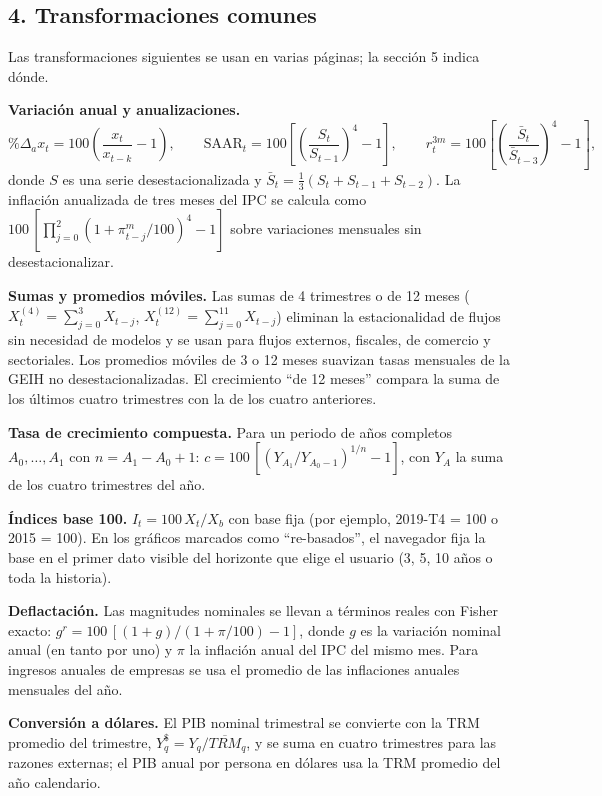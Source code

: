 \hypertarget{transformaciones-comunes}{%
\subsection{4. Transformaciones
comunes}\label{transformaciones-comunes}}

Las transformaciones siguientes se usan en varias páginas; la sección 5
indica dónde.

\textbf{Variación anual y anualizaciones.}
\[\%\Delta_{a} x_t = 100\left(\frac{x_t}{x_{t-k}}-1\right),\qquad
\text{SAAR}_t = 100\left[\left(\frac{S_t}{S_{t-1}}\right)^{4}-1\right],\qquad
r^{3m}_t = 100\left[\left(\frac{\bar S_{t}}{\bar S_{t-3}}\right)^{4}-1\right],\]
donde \(S\) es una serie desestacionalizada y
\(\bar S_t = \tfrac13(S_t+S_{t-1}+S_{t-2})\). La inflación anualizada de
tres meses del IPC se calcula como
\(100\,[\prod_{j=0}^{2}(1+\pi^m_{t-j}/100)^{4}-1]\) sobre variaciones
mensuales sin desestacionalizar.

\textbf{Sumas y promedios móviles.} Las sumas de 4 trimestres o de 12
meses (\(X^{(4)}_t=\sum_{j=0}^{3}X_{t-j}\),
\(X^{(12)}_t=\sum_{j=0}^{11}X_{t-j}\)) eliminan la estacionalidad de
flujos sin necesidad de modelos y se usan para flujos externos,
fiscales, de comercio y sectoriales. Los promedios móviles de 3 o 12
meses suavizan tasas mensuales de la GEIH no desestacionalizadas. El
crecimiento ``de 12 meses'' compara la suma de los últimos cuatro
trimestres con la de los cuatro anteriores.

\textbf{Tasa de crecimiento compuesta.} Para un periodo de años
completos \(A_0,\dots,A_1\) con \(n=A_1-A_0+1\):
\(c = 100\,[(Y_{A_1}/Y_{A_0-1})^{1/n}-1]\), con \(Y_A\) la suma de los
cuatro trimestres del año.

\textbf{Índices base 100.} \(I_t = 100\,X_t/X_{b}\) con base fija (por
ejemplo, 2019-T4 = 100 o 2015 = 100). En los gráficos marcados como
``re-basados'', el navegador fija la base en el primer dato visible del
horizonte que elige el usuario (3, 5, 10 años o toda la historia).

\textbf{Deflactación.} Las magnitudes nominales se llevan a términos
reales con Fisher exacto: \(g^{r} = 100\,[(1+g)/(1+\pi/100)-1]\), donde
\(g\) es la variación nominal anual (en tanto por uno) y \(\pi\) la
inflación anual del IPC del mismo mes. Para ingresos anuales de empresas
se usa el promedio de las inflaciones anuales mensuales del año.

\textbf{Conversión a dólares.} El PIB nominal trimestral se convierte
con la TRM promedio del trimestre, \(Y^{\$}_q = Y_q/\overline{TRM}_q\),
y se suma en cuatro trimestres para las razones externas; el PIB anual
por persona en dólares usa la TRM promedio del año calendario.

